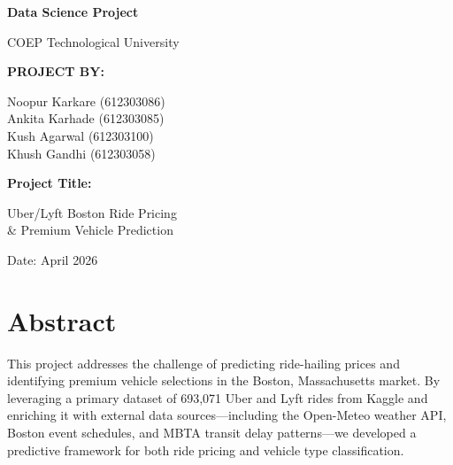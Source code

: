 \documentclass[12pt,a4paper]{article}
\begin{document}
\begin{titlepage}
\centering
\vspace*{2cm}
{\LARGE\bfseries Data Science Project\par}
\vspace{2cm}
{\Large COEP Technological University\par}
\vspace{1.5cm}
{\large\bfseries PROJECT BY:\par}
\vspace{0.5cm}
{\large
Noopur Karkare (612303086)\\
Ankita Karhade (612303085)\\
Kush Agarwal (612303100)\\
Khush Gandhi (612303058)\par}
\vspace{2cm}
{\Large\bfseries Project Title:\par}
\vspace{0.3cm}
{\LARGE Uber/Lyft Boston Ride Pricing\\ \& Premium Vehicle Prediction\par}
\vspace{2cm}
{\large Date: April 2026\par}
\vfill
\end{titlepage}

\tableofcontents
\newpage

\section{Abstract}

This project addresses the challenge of predicting ride-hailing prices and identifying premium vehicle selections in the Boston, Massachusetts market. By leveraging a primary dataset of 693,071 Uber and Lyft rides from Kaggle and enriching it with external data sources---including the Open-Meteo weather API, Boston event schedules, and MBTA transit delay patterns---we developed a predictive framework for both ride pricing and vehicle type classification.
\end{document}
